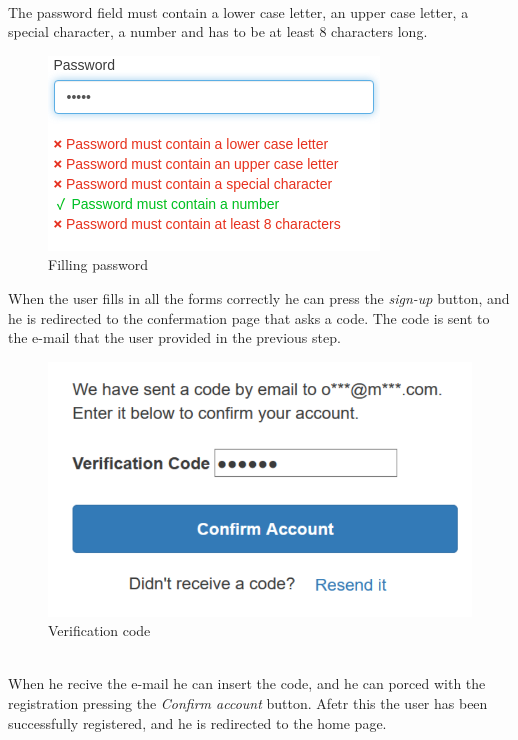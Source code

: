 \\
The password field must contain a lower case letter, an upper case letter, a special character, a number and has to be at least 8 characters long.
\begin{figure}[!ht]
    \caption{Filling password}
    \vspace{10px}
    \includegraphics[scale=0.5]{../../../../Images/userManual/insertPWD.png}
    \centering
\end{figure}
\newpage
When the user fills in all the forms correctly he can press the \textit{sign-up} button, and he is redirected to the confermation page that asks a code.
The code is sent to the e-mail that the user provided in the previous step.
\begin{figure}[!ht]
    \caption{Verification code}
    \vspace{10px}
    \includegraphics[scale=0.3]{../../../../Images/userManual/confermationCode.png}
    \centering
\end{figure}
\\
When he recive the e-mail he can insert the code, and he can porced with the registration pressing the \textit{Confirm account} button. Afetr this the user has been successfully registered, and he is redirected to the home page.

